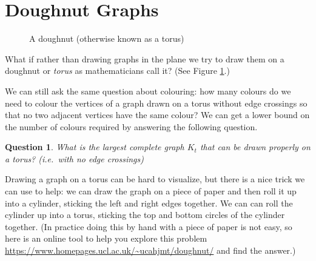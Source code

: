 \documentclass[12pt]{article}
\newtheorem{question}{Question}
\begin{document}
\fi

\section*{Doughnut Graphs}
\begin{figure}[!h]
\begin{center}
\end{center}\caption{A doughnut (otherwise known as a torus)}\label{torus}
\end{figure}



What if rather than drawing graphs in the plane we try to draw them on a doughnut or \emph{torus} as mathematicians call it? (See Figure \ref{torus}.) 

We can still ask the same question about colouring: how many colours do we need to colour the vertices of a graph drawn on a torus without edge crossings so that no two adjacent vertices have the same colour? We can get a lower bound on the number of colours required by answering the following question.
\begin{question}
What is the largest complete graph $K_t$ that can be drawn properly on a torus? (i.e.~with no edge crossings)
\end{question}
Drawing a graph on a torus can be hard to visualize, but there is a nice trick we can use to help: we can draw the graph on a piece of paper and then roll it up into a cylinder, sticking the left and right edges together. We can can roll the cylinder up into a torus, sticking the top and bottom circles of the cylinder together. (In practice doing this by hand with a piece of paper is not easy, so here is an online tool to help you explore this problem \url{https://www.homepages.ucl.ac.uk/~ucahjmt/doughnut/} and find the answer.)
\end{document}
